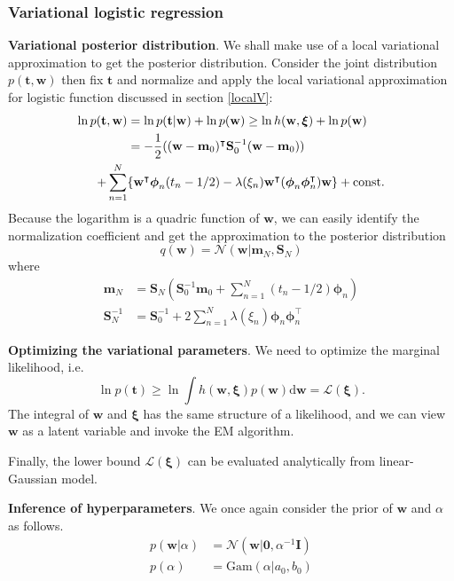\documentclass[a4paper]{book}
\newcommand{\ud}{\mathrm{d}}
\newcommand{\up}{\mathrm}
\renewcommand{\bf}{\mathbf}
\renewcommand{\cal}{\mathcal}
\newcommand{\bs}{\boldsymbol}
\begin{document}
\subsubsection{Variational logistic regression}
\textbf{Variational posterior distribution}. We shall make use of a local variational approximation to get the posterior distribution. Consider the joint distribution $p(\bf{t,w})$ then fix $\bf{t}$ and normalize and apply the local variational approximation for logistic function discussed in section \ref{localV}:
\begin{align}
	\ln p(\bf{t,w}) &= \ln p(\bf{t|w})+ \ln p(\bf{w}) \geq \ln h(\bf{w},\bs{\xi})+ \ln p(\bf{w}) \notag \\
	&= -\frac{1}{2}((\bf{w-m}_0)^{\intercal} \bf{S}_0^{-1} (\bf{w-m}_0)) \notag\\
	+\sum_{n=1}^N & \{ \bf{w}^{\intercal}\bs{\phi}_n (t_n-1/2)-\lambda(\xi_n)\bf{w}^{\intercal} (\bs{\phi}_n \bs{\phi}_n^{\intercal})\bf{w} \} +\up{const}.		
\end{align}
Because the logarithm is a quadric function of $\bf{w}$, we can easily identify the normalization coefficient and get the approximation to the posterior distribution
\begin{equation}
	q(\bf{w}) = \cal{N}(\bf{w}|\bf{m}_N,\bf{S}_N)
\end{equation}
where
\begin{align}
	\bf{m}_N &= \bf{S}_N \left( \bf{S}_0^{-1} \bf{m}_0 + \sum_{n=1}^N(t_n-1/2)\bs{\phi}_n \right)\\
	\bf{S}_N^{-1} &= \bf{S}_0^{-1} + 2\sum_{n=1}^N \lambda(\xi_n)\bs{\phi}_n \bs{\phi}_n^{\intercal}
\end{align}

\textbf{Optimizing the variational parameters}. We need to optimize the marginal likelihood, i.e.
\begin{equation}
	\ln p(\bf{t}) \geq \ln \int h(\bf{w},\bs{\xi})p(\bf{w})\ud \bf{w} = \cal{L}(\bs{\xi}).
\end{equation}
The integral of $\bf{w}$ and $\bs{\xi}$ has the same structure of a likelihood, and we can view $\bf{w}$ as a latent variable and invoke the EM algorithm.

Finally, the lower bound $\cal{L}(\bs{\xi})$ can be evaluated analytically from linear-Gaussian model.

\textbf{Inference of hyperparameters}. We once again consider the prior of $\bf{w}$ and $\alpha$ as follows.
\begin{align}
	p(\bf{w}|\alpha) &= \cal{N} (\bf{w}|\bf{0},\alpha^{-1}\bf{I}) \\
	p(\alpha) &= \up{Gam}(\alpha|a_0,b_0)
\end{align}
\end{document}
